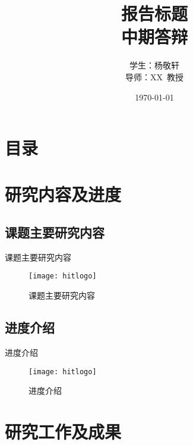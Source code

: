\documentclass[compress]{beamer}
\begin{document}
\graphicspath{{figures/}}

\title[报告标题]{报告标题\\[2mm] 中期答辩}
\author[杨敬轩]{学生：杨敬轩\\[5mm] 导师：XX\ 教授}
\date{\small \vskip -10pt \today}

\begin{frame}
		\maketitle
\end{frame}

\section*{目录}
\frame{
  \frametitle{\secname}
  \tableofcontents[hideallsubsections]
}

\section{研究内容及进度}

\subsection{课题主要研究内容}

\begin{frame}{课题主要研究内容}
  \begin{figure}
    \texttt{[image: hitlogo]}
    \caption{课题主要研究内容}
  \end{figure}
\end{frame}

\subsection{进度介绍}

\begin{frame}{进度介绍}
  \begin{figure}
    \texttt{[image: hitlogo]}
    \caption{进度介绍}
  \end{figure}
\end{frame}

\section{研究工作及成果}
\end{document}
